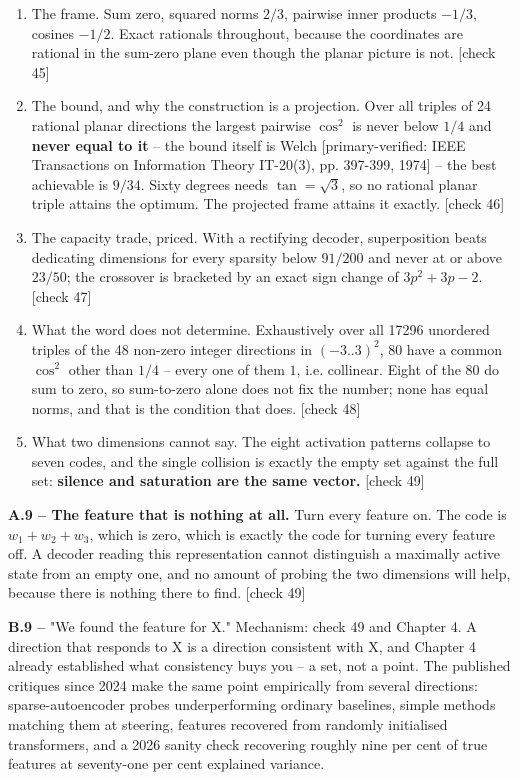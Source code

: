\begin{enumerate}
\item The frame. Sum zero, squared norms $2/3$, pairwise inner products $-1/3$, cosines $-1/2$. Exact rationals throughout, because the coordinates are rational in the sum-zero plane even though the planar picture is not. [check 45]
\item The bound, and why the construction is a projection. Over all triples of 24 rational planar directions the largest pairwise $\cos^2$ is never below $1/4$ and \textbf{never equal to it} -- the bound itself is Welch [primary-verified: IEEE Transactions on Information Theory IT-20(3), pp. 397-399, 1974] -- the best achievable is $9/34$. Sixty degrees needs $\tan = \sqrt{3}$, so no rational planar triple attains the optimum. The projected frame attains it exactly. [check 46]
\item The capacity trade, priced. With a rectifying decoder, superposition beats dedicating dimensions for every sparsity below $91/200$ and never at or above $23/50$; the crossover is bracketed by an exact sign change of $3p^2 + 3p - 2$. [check 47]
\item What the word does not determine. Exhaustively over all 17296 unordered triples of the 48 non-zero integer directions in $(-3..3)^2$, 80 have a common $\cos^2$ other than $1/4$ -- every one of them $1$, i.e. collinear. Eight of the 80 do sum to zero, so sum-to-zero alone does not fix the number; none has equal norms, and that is the condition that does. [check 48]
\item What two dimensions cannot say. The eight activation patterns collapse to seven codes, and the single collision is exactly the empty set against the full set: \textbf{silence and saturation are the same vector.} [check 49]
\end{enumerate}


\textbf{A.9 -- The feature that is nothing at all.} Turn every feature on. The code is $w_1 + w_2 + w_3$, which is zero, which is exactly the code for turning every feature off. A decoder reading this representation cannot distinguish a maximally active state from an empty one, and no amount of probing the two dimensions will help, because there is nothing there to find. [check 49]

\textbf{B.9 --} "We found the feature for X." Mechanism: check 49 and Chapter 4. A direction that responds to X is a direction consistent with X, and Chapter 4 already established what consistency buys you -- a set, not a point. The published critiques since 2024 make the same point empirically from several directions: sparse-autoencoder probes underperforming ordinary baselines, simple methods matching them at steering, features recovered from randomly initialised transformers, and a 2026 sanity check recovering roughly nine per cent of true features at seventy-one per cent explained variance.

